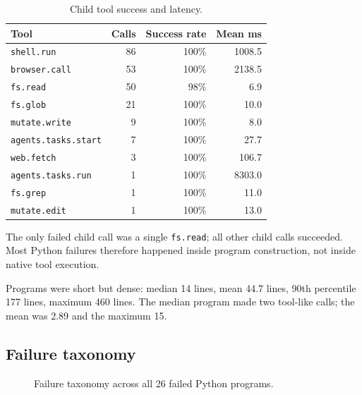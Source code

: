 \documentclass[11pt]{article}
\newcommand{\code}[1]{\texttt{#1}}
\begin{document}
\begin{table}[h]
\centering
\small
\begin{tabular}{lrrr}
\toprule
\textbf{Tool} & \textbf{Calls} & \textbf{Success rate} & \textbf{Mean ms} \\
\midrule
\code{shell.run} & 86 & 100\% & 1008.5 \\
\code{browser.call} & 53 & 100\% & 2138.5 \\
\code{fs.read} & 50 & 98\% & 6.9 \\
\code{fs.glob} & 21 & 100\% & 10.0 \\
\code{mutate.write} & 9 & 100\% & 8.0 \\
\code{agents.tasks.start} & 7 & 100\% & 27.7 \\
\code{web.fetch} & 3 & 100\% & 106.7 \\
\code{agents.tasks.run} & 1 & 100\% & 8303.0 \\
\code{fs.grep} & 1 & 100\% & 11.0 \\
\code{mutate.edit} & 1 & 100\% & 13.0 \\
\bottomrule
\end{tabular}
\caption{Child tool success and latency.}
\end{table}

The only failed child call was a single \code{fs.read}; all other child calls
succeeded.  Most Python failures therefore happened inside program construction,
not inside native tool execution.

Programs were short but dense: median 14 lines, mean 44.7 lines, 90th percentile
177 lines, maximum 460 lines.  The median program made two tool-like calls; the
mean was 2.89 and the maximum 15.

\subsection{Failure taxonomy}

\begin{figure}[h]
\centering
{}
\caption{Failure taxonomy across all 26 failed Python programs.}
\end{figure}
\end{document}
